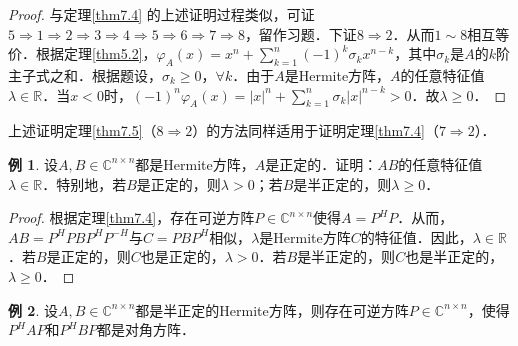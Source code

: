 \documentclass[a4paper,fontset=windows]{ctexbook}
\theoremstyle{definition}
\newtheorem{example}{例}[chapter]
\def\note{\noindent\raisebox{10pt}{\dbend}\hspace{7pt}}
\renewcommand{\ge}{\geqslant}
\begin{document}
\begin{proof}
与定理\ref{thm7.4} 的上述证明过程类似，可证$5\Rightarrow 1\Rightarrow 2\Rightarrow 3\Rightarrow 4\Rightarrow 5\Rightarrow 6\Rightarrow 7\Rightarrow 8$，留作习题．下证$8\Rightarrow 2$．从而$1\sim 8$相互等价．根据定理\ref{thm5.2}，$\varphi_A(x)=x^n+\sum\limits_{k=1}^n(-1)^k\sigma_kx^{n-k}$，其中$\sigma_k$是$A$的$k$阶主子式之和．根据题设，$\sigma_k\ge 0$，$\forall k$．由于$A$是Hermite方阵，$A$的任意特征值$\lambda\in\mathbb{R}$．当$x<0$时，$(-1)^n\varphi_A(x)=|x|^n+\sum\limits_{k=1}^n\sigma_k|x|^{n-k}>0$．故$\lambda\ge 0$．
\end{proof}

\note 上述证明定理\ref{thm7.5}（$8\Rightarrow 2$）的方法同样适用于证明定理\ref{thm7.4}（$7\Rightarrow 2$）．

\begin{example}
设$A,B\in\mathbb{C}^{n\times n}$都是Hermite方阵，$A$是正定的．证明：$AB$的任意特征值$\lambda\in\mathbb{R}$．特别地，若$B$是正定的，则$\lambda>0$；若$B$是半正定的，则$\lambda\ge 0$．
\end{example}

\begin{proof}
根据定理\ref{thm7.4}，存在可逆方阵$P\in\mathbb{C}^{n\times n}$使得$A=P^HP$．从而，$AB=P^HPBP^HP^{-H}$与$C=PBP^H$相似，$\lambda$是Hermite方阵$C$的特征值．因此，$\lambda\in\mathbb{R}$．若$B$是正定的，则$C$也是正定的，$\lambda>0$．若$B$是半正定的，则$C$也是半正定的，$\lambda\ge 0$．
\end{proof}

\begin{example}
设$A,B\in\mathbb{C}^{n\times n}$都是半正定的Hermite方阵，则存在可逆方阵$P\in\mathbb{C}^{n\times n}$，使得$P^HAP$和$P^HBP$都是对角方阵．
\end{example}
\end{document}
